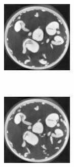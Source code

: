 \documentclass[journal]{IEEEtran}
\begin{document}
\begin{figure}[!h]
\begin{subfigure}[b]{0.3\linewidth}
\captionsetup{labelformat=empty}
        \caption{}
     \end{subfigure}
\quad
    \begin{subfigure}[b]{0.3\linewidth}
        \includegraphics[width=\textwidth]{../images/sprouts/template_3.png}
\captionsetup{labelformat=empty}
        \caption{}
     \end{subfigure}\\
    \begin{subfigure}[b]{0.3\linewidth}
        \includegraphics[width=\textwidth]{../images/sprouts/template_4.png}

\end{subfigure}
\end{figure}
\end{document}
